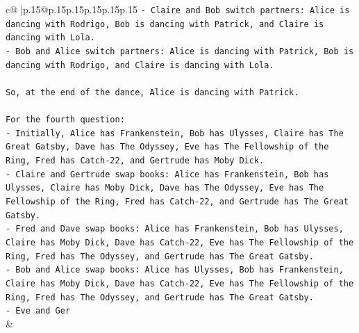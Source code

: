 \documentclass{article}
\begin{document}
{\begin{supertabular}{c@{$\;$}|p{.15\linewidth}@{}p{.15\linewidth}p{.15\linewidth}p{.15\linewidth}p{.15\linewidth}p{.15\linewidth}}
{{{\texttt{{-} Claire and Bob switch partners: Alice is dancing with Rodrigo, Bob is dancing with Patrick, and Claire is dancing with Lola.} \\
\texttt{{-} Bob and Alice switch partners: Alice is dancing with Patrick, Bob is dancing with Rodrigo, and Claire is dancing with Lola.} \\
\\ 
\texttt{So, at the end of the dance, Alice is dancing with Patrick.} \\
\\ 
\texttt{For the fourth question:} \\
\texttt{{-} Initially, Alice has Frankenstein, Bob has Ulysses, Claire has The Great Gatsby, Dave has The Odyssey, Eve has The Fellowship of the Ring, Fred has Catch{-}22, and Gertrude has Moby Dick.} \\
\texttt{{-} Claire and Gertrude swap books: Alice has Frankenstein, Bob has Ulysses, Claire has Moby Dick, Dave has The Odyssey, Eve has The Fellowship of the Ring, Fred has Catch{-}22, and Gertrude has The Great Gatsby.} \\
\texttt{{-} Fred and Dave swap books: Alice has Frankenstein, Bob has Ulysses, Claire has Moby Dick, Dave has Catch{-}22, Eve has The Fellowship of the Ring, Fred has The Odyssey, and Gertrude has The Great Gatsby.} \\
\texttt{{-} Bob and Alice swap books: Alice has Ulysses, Bob has Frankenstein, Claire has Moby Dick, Dave has Catch{-}22, Eve has The Fellowship of the Ring, Fred has The Odyssey, and Gertrude has The Great Gatsby.} \\
\texttt{{-} Eve and Ger} \\
            }
        }
    }
    & \\ \\


\end{supertabular}}
\end{document}
